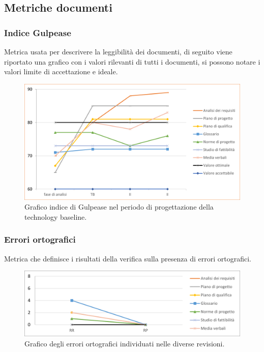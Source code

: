 \subsection{Metriche documenti}
\subsubsection{Indice Gulpease}
Metrica usata per descrivere la leggibilità dei documenti, di seguito viene riportato una grafico con i valori rilevanti di tutti i documenti, si possono notare i valori limite di accettazione e ideale.
\begin{figure}[h]
	\centering
	\includegraphics[scale=1]{Images/IndiceDiGulpease.png}
	\caption{Graﬁco indice di Gulpease nel periodo di progettazione della technology baseline.}
\end{figure}
\subsubsection{Errori ortografici}
Metrica che definisce i risultati della veriﬁca sulla presenza di errori ortograﬁci.
\begin{figure}[h]
	\centering
	\includegraphics[scale=1]{Images/ErroriOrtografici.png}
	\caption{Graﬁco degli errori ortograﬁci individuati nelle diverse revisioni.}
\end{figure}